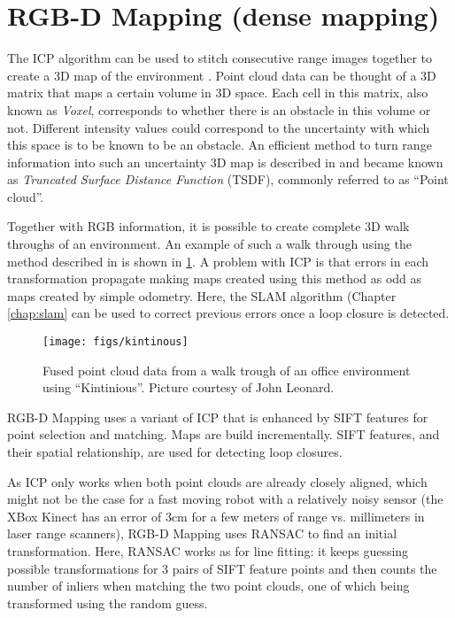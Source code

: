 \section{RGB-D Mapping (dense mapping)}
The ICP algorithm can be used to stitch consecutive range images together to create a 3D map of the environment \cite{henry2010rgb}. Point cloud data can be thought of a 3D matrix that maps a certain volume in 3D space. Each cell in this matrix, also known as \emph{Voxel}, corresponds to whether there is an obstacle in this volume or not. Different intensity values could correspond to the uncertainty with which this space is to be known to be an obstacle. An efficient method to turn range information into such an uncertainty 3D map is described in \cite{curless96} and became known as \emph{Truncated Surface Distance Function} (TSDF), commonly referred to as ``Point cloud''.

Together with RGB information, it is possible to create complete 3D walk throughs of an environment. An example of such a walk through using the method described in \cite{whelan2013robust} is shown in \cref{fig:kintinous}.
A problem with ICP is that errors in each transformation propagate making maps created using this method as odd as maps created by simple odometry. Here, the SLAM algorithm (Chapter \ref{chap:slam} can be used to correct previous errors once a loop closure is detected.

\begin{figure}
    \centering
    \texttt{[image: figs/kintinous]}
    \caption{Fused point cloud data from a walk trough of an office environment using ``Kintinious''. Picture courtesy of John Leonard.\label{fig:kintinous}}
\end{figure}

RGB-D Mapping uses a variant of ICP that is enhanced by SIFT features for point selection and matching. Maps are build incrementally. SIFT features, and their spatial relationship, are used for detecting loop closures. %

As ICP only works when both point clouds are already closely aligned, which might not be the case for a fast moving robot with a relatively noisy sensor (the XBox Kinect has an error of 3cm for a few meters of range vs. millimeters in laser range scanners), RGB-D Mapping uses RANSAC to find an initial transformation. Here, RANSAC works as for line fitting: it keeps guessing possible transformations for 3 pairs of SIFT feature points and then counts the number of inliers when matching the two point clouds, one of which being transformed using the random guess.


